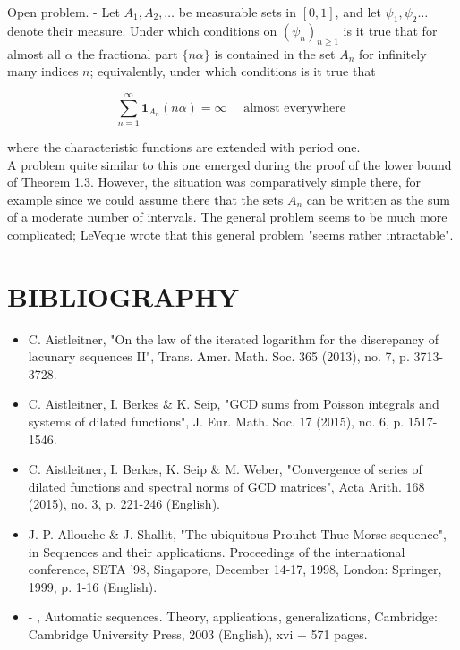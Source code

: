 \documentclass[10pt]{article}
\begin{document}
Open problem. - Let $A_{1}, A_{2}, \ldots$ be measurable sets in $[0,1]$, and let $\psi_{1}, \psi_{2} \ldots$ denote their measure. Under which conditions on $\left(\psi_{n}\right)_{n \geqslant 1}$ is it true that for almost all $\alpha$ the fractional part $\{n \alpha\}$ is contained in the set $A_{n}$ for infinitely many indices $n$; equivalently, under which conditions is it true that

$$
\sum_{n=1}^{\infty} \mathbf{1}_{A_{n}}(n \alpha)=\infty \quad \text { almost everywhere }
$$

where the characteristic functions are extended with period one.\\
A problem quite similar to this one emerged during the proof of the lower bound of Theorem 1.3. However, the situation was comparatively simple there, for example since we could assume there that the sets $A_{n}$ can be written as the sum of a moderate number of intervals. The general problem seems to be much more complicated; LeVeque wrote that this general problem "seems rather intractable".

\section*{BIBLIOGRAPHY}
\begin{itemize}
  \item[] [1] C. Aistleitner, "On the law of the iterated logarithm for the discrepancy of lacunary sequences II", Trans. Amer. Math. Soc. 365 (2013), no. 7, p. 3713-3728.
  \item[] [2] C. Aistleitner, I. Berkes \& K. Seip, "GCD sums from Poisson integrals and systems of dilated functions", J. Eur. Math. Soc. 17 (2015), no. 6, p. 1517-1546.
  \item[] [3] C. Aistleitner, I. Berkes, K. Seip \& M. Weber, "Convergence of series of dilated functions and spectral norms of GCD matrices", Acta Arith. 168 (2015), no. 3, p. 221-246 (English).
  \item[] [4] J.-P. Allouche \& J. Shallit, "The ubiquitous Prouhet-Thue-Morse sequence", in Sequences and their applications. Proceedings of the international conference, SETA '98, Singapore, December 14-17, 1998, London: Springer, 1999, p. 1-16 (English).
  \item[] [5] - , Automatic sequences. Theory, applications, generalizations, Cambridge: Cambridge University Press, 2003 (English), xvi + 571 pages.
\end{itemize}
\end{document}
